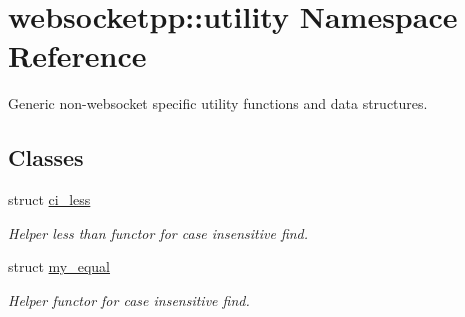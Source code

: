 \hypertarget{namespacewebsocketpp_1_1utility}{}\section{websocketpp\+:\+:utility Namespace Reference}
\label{namespacewebsocketpp_1_1utility}


Generic non-\/websocket specific utility functions and data structures.  


\subsection*{Classes}
\begin{DoxyCompactItemize}
\item 
struct \hyperlink{structwebsocketpp_1_1utility_1_1ci__less}{ci\+\_\+less}
\begin{DoxyCompactList}\small\item\em Helper less than functor for case insensitive find. \end{DoxyCompactList}\item 
struct \hyperlink{structwebsocketpp_1_1utility_1_1my__equal}{my\+\_\+equal}
\begin{DoxyCompactList}\small\item\em Helper functor for case insensitive find. \end{DoxyCompactList}\end{DoxyCompactItemize}
